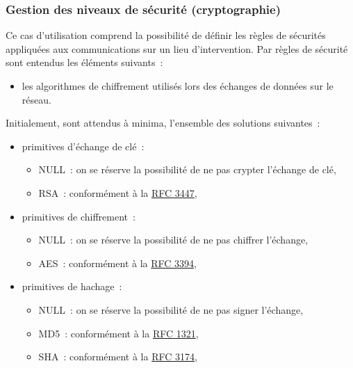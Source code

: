 \subsubsection{Gestion des niveaux de sécurité (cryptographie)}
Ce cas d'utilisation comprend la possibilité de définir les règles de sécurités appliquées aux communications sur un lieu d'intervention. Par règles de sécurité sont entendus les éléments suivants~:
\begin{itemize}
	\item les algorithmes de chiffrement utilisés lors des échanges de données sur le réseau.
\end{itemize}
Initialement, sont attendus à minima, l'ensemble des solutions suivantes~:
\begin{itemize}
	\item primitives d'échange de clé~:
	\begin{itemize}
		\item NULL~: on se réserve la possibilité de ne pas crypter l'échange de clé,
		\item RSA~: conformément à la \href{http://tools.ietf.org/html/rfc3447}{RFC 3447},
	\end{itemize}
	\item primitives de chiffrement~:
	\begin{itemize}
		\item NULL~: on se réserve la possibilité de ne pas chiffrer l'échange,
		\item AES~: conformément à la \href{http://tools.ietf.org/html/rfc3394}{RFC 3394},
	\end{itemize}
	\item primitives de hachage~:
	\begin{itemize}
		\item NULL~: on se réserve la possibilité de ne pas signer l'échange,
		\item MD5~: conformément à la \href{http://tools.ietf.org/html/rfc1321}{RFC 1321},
		\item SHA~: conformément à la \href{http://tools.ietf.org/html/rfc3174}{RFC 3174},
	\end{itemize}
\end{itemize}
